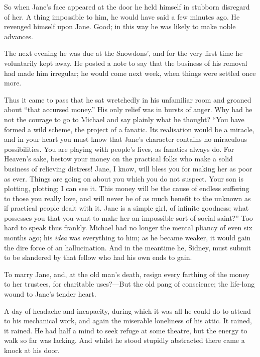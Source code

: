 {\protect\hypertarget{280}{}{}}So when Jane's face appeared at the door
he held himself in stubborn disregard of her. A thing impossible to him,
he would have said a few minutes ago. He revenged himself upon Jane.
Good; in this way he was likely to make noble advances.

The next evening he was due at the Snowdons', and for the very first
time he voluntarily kept away. He posted a note to say that the business
of his removal had made him irregular; he would come next week, when
things were settled once more.

Thus it came to pass that he sat wretchedly in his unfamiliar room and
groaned about ``that accursed money.'' His only relief was in bursts of
anger. Why had he not the courage to go to Michael and say plainly what
he thought? ``You have formed a wild scheme, the project of a fanatic.
Its realisation would be a miracle, and in your heart you must know that
Jane's character contains no miraculous possibilities. You are playing
with people's lives, as fanatics always do. For Heaven's sake, bestow
your money on the {\protect\hypertarget{281}{}{}}practical folks who
make a solid business of relieving distress! Jane, I know, will bless
you for making her as poor as ever. Things are going on about you which
you do not suspect. Your son is plotting, plotting; I can see it. This
money will be the cause of endless suffering to those you really love,
and will never be of as much benefit to the unknown as if practical
people dealt with it. Jane is a simple girl, of infinite goodness; what
possesses you that you want to make her an impossible sort of social
saint?'' Too hard to speak thus frankly. Michael had no longer the
mental pliancy of even six months ago; his \emph{idea} was everything to
him; as he became weaker, it would gain the dire force of an
hallucination. And in the meantime he, Sidney, must submit to be
slandered by that fellow who had his own ends to gain.

To marry Jane, and, at the old man's death, resign every farthing of the
money to her trustees, for charitable uses?---But the old pang of
conscience; the life-long wound to Jane's tender heart.

{\protect\hypertarget{282}{}{}}A day of headache and incapacity, during
which it was all he could do to attend to his mechanical work, and again
the miserable loneliness of his attic. It rained, it rained. He had half
a mind to seek refuge at some theatre, but the energy to walk so far was
lacking. And whilst he stood stupidly abstracted there came a knock at
his door.

